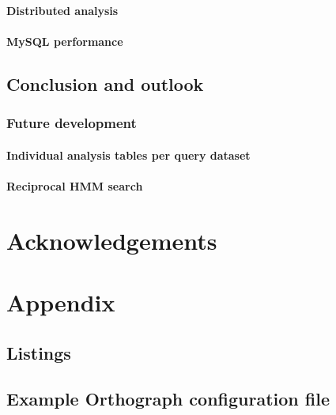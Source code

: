 \documentclass[a4paper,12pt]{scrreprt}
\newcommand{\pname}{Orthograph\xspace}
\begin{document}
		\subsubsection{Distributed analysis}
			
		\subsubsection{MySQL performance}
			
	\section{Conclusion and outlook}
		
		\subsection{Future development}
			
			\subsubsection{Individual analysis tables per query dataset}
				
			\subsubsection{Reciprocal HMM search}
				

\clearpage

%
%
{}
\chapter*{Acknowledgements}
	
	\clearpage

%
%
{}
%
%
\printbibliography
\clearpage

%
%
\appendix
\chapter{Appendix}
	\section{Listings}
		
	\clearpage
	\section{Example \pname configuration file}
		
	\clearpage
\end{document}
